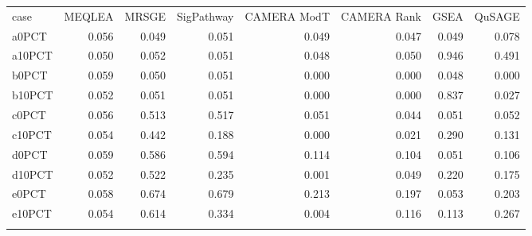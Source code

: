 \documentclass[a4,center,fleqn]{NAR}
\begin{document}
	\begin{table}[ht]
		\centering
		\begin{tabular}{lrrrrrrr}
			 \toprule
			case & MEQLEA & MRSGE & SigPathway & CAMERA ModT & CAMERA Rank & GSEA & QuSAGE \\ 
			\colrule
			a0PCT & 0.056 & 0.049 & 0.051 & 0.049 & 0.047 & 0.049 & 0.078 \\ 
			a10PCT & 0.050 & 0.052 & 0.051 & 0.048 & 0.050 & 0.946 & 0.491 \\ 
			b0PCT & 0.059 & 0.050 & 0.051 & 0.000 & 0.000 & 0.048 & 0.000 \\ 
			b10PCT & 0.052 & 0.051 & 0.051 & 0.000 & 0.000 & 0.837 & 0.027 \\ 
			c0PCT & 0.056 & 0.513 & 0.517 & 0.051 & 0.044 & 0.051 & 0.052 \\ 
			c10PCT & 0.054 & 0.442 & 0.188 & 0.000 & 0.021 & 0.290 & 0.131 \\ 
			d0PCT & 0.059 & 0.586 & 0.594 & 0.114 & 0.104 & 0.051 & 0.106 \\ 
			d10PCT & 0.052 & 0.522 & 0.235 & 0.001 & 0.049 & 0.220 & 0.175 \\ 
			e0PCT & 0.058 & 0.674 & 0.679 & 0.213 & 0.197 & 0.053 & 0.203 \\ 
			e10PCT & 0.054 & 0.614 & 0.334 & 0.004 & 0.116 & 0.113 & 0.267 \\ 
			\botrule
		\end{tabular}
	\end{table}
	
	
	
\end{document}
